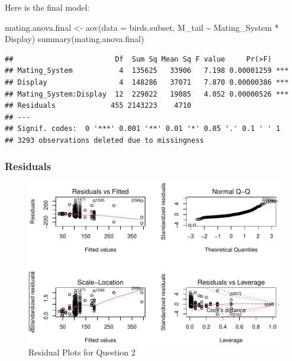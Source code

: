 \documentclass[
  12pt,
]{article}
\newenvironment{Shaded}{\begin{snugshade}}{\end{snugshade}}
\newcommand{\AttributeTok}[1]{\textcolor[rgb]{0.77,0.63,0.00}{#1}}
\newcommand{\FunctionTok}[1]{\textcolor[rgb]{0.00,0.00,0.00}{#1}}
\newcommand{\NormalTok}[1]{#1}
\newcommand{\OtherTok}[1]{\textcolor[rgb]{0.56,0.35,0.01}{#1}}
\newcommand{\SpecialCharTok}[1]{\textcolor[rgb]{0.00,0.00,0.00}{#1}}
\begin{document}
Here is the final model:

\begin{Shaded}
\begin{Highlighting}[]
\NormalTok{mating.anova.final }\OtherTok{\textless{}{-}} \FunctionTok{aov}\NormalTok{(}\AttributeTok{data =}\NormalTok{ birds.subset, M\_tail }\SpecialCharTok{\textasciitilde{}}\NormalTok{ Mating\_System }\SpecialCharTok{*}\NormalTok{ Display)}
\FunctionTok{summary}\NormalTok{(mating.anova.final)}
\end{Highlighting}
\end{Shaded}

\begin{verbatim}
##                        Df  Sum Sq Mean Sq F value     Pr(>F)    
## Mating_System           4  135625   33906   7.198 0.00001259 ***
## Display                 4  148286   37071   7.870 0.00000386 ***
## Mating_System:Display  12  229022   19085   4.052 0.00000526 ***
## Residuals             455 2143223    4710                       
## ---
## Signif. codes:  0 '***' 0.001 '**' 0.01 '*' 0.05 '.' 0.1 ' ' 1
## 3293 observations deleted due to missingness
\end{verbatim}

\newpage

\hypertarget{residuals-1}{%
\subsubsection{Residuals}\label{residuals-1}}

\begin{figure}
\centering
\includegraphics{Project_Code_files/figure-latex/q-2 residual-1.pdf}
\caption{Residual Plots for Question 2}
\end{figure}
\end{document}
